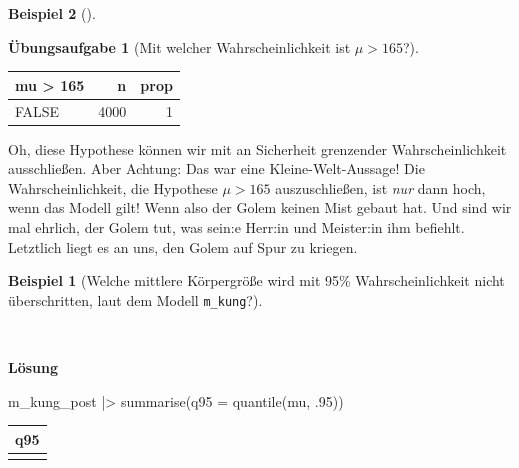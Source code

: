 \documentclass[
  ngerman,
  letterpaper,
  twoside,
  open=any]{scrbook}
\newenvironment{Shaded}{\begin{snugshade}}{\end{snugshade}}
\newcommand{\AttributeTok}[1]{\textcolor[rgb]{0.40,0.45,0.13}{#1}}
\newcommand{\DecValTok}[1]{\textcolor[rgb]{0.68,0.00,0.00}{#1}}
\newcommand{\FunctionTok}[1]{\textcolor[rgb]{0.28,0.35,0.67}{#1}}
\newcommand{\NormalTok}[1]{\textcolor[rgb]{0.00,0.23,0.31}{#1}}
\newcommand{\SpecialCharTok}[1]{\textcolor[rgb]{0.37,0.37,0.37}{#1}}
\newcounter{none} %
\theoremstyle{definition}
\newtheorem{example}{Beispiel}[chapter]
\theoremstyle{plain}
\theoremstyle{definition}
\newtheorem{exercise}{Übungsaufgabe}[chapter]
\theoremstyle{definition}
\theoremstyle{remark}
\begin{document}
\begin{example}[]
\begin{exercise}[Mit welcher Wahrscheinlichkeit ist
\(\mu>165\)?]
\begin{tcolorbox}[enhanced jigsaw, arc=.35mm, bottomrule=.15mm, breakable, colback=white, colframe=quarto-callout-tip-color-frame, left=2mm, leftrule=.75mm, opacityback=0, rightrule=.15mm, toprule=.15mm]
{\def\LTcaptype{none} %
\begin{longtable}[]{@{}lrr@{}}
\toprule\noalign{}
mu \textgreater{} 165 & n & prop \\
\midrule\noalign{}
\endhead
\bottomrule\noalign{}
\endlastfoot
FALSE & 4000 & 1 \\
\end{longtable}
}

Oh, diese Hypothese können wir mit an Sicherheit grenzender
Wahrscheinlichkeit ausschließen. Aber Achtung: Das war eine
Kleine-Welt-Aussage! Die Wahrscheinlichkeit, die Hypothese \(\mu > 165\)
auszuschließen, ist \emph{nur} dann hoch, wenn das Modell gilt! Wenn
also der Golem keinen Mist gebaut hat. Und sind wir mal ehrlich, der
Golem tut, was sein:e Herr:in und Meister:in ihm befiehlt. Letztlich
liegt es an uns, den Golem auf Spur zu kriegen.

\end{tcolorbox}

\end{exercise}

\begin{example}[Welche mittlere Körpergröße wird mit 95\%
Wahrscheinlichkeit nicht überschritten, laut dem Modell
\texttt{m\_kung}?]\protect\hypertarget{exm-kung3}{}\label{exm-kung3}

~

\begin{tcolorbox}[enhanced jigsaw, arc=.35mm, bottomrule=.15mm, breakable, colback=white, colframe=quarto-callout-tip-color-frame, left=2mm, leftrule=.75mm, opacityback=0, rightrule=.15mm, toprule=.15mm]

\vspace{-3mm}\textbf{Lösung}\vspace{3mm}

\begin{Shaded}
\begin{Highlighting}[]
\NormalTok{m\_kung\_post }\SpecialCharTok{|\textgreater{}} 
  \FunctionTok{summarise}\NormalTok{(}\AttributeTok{q95 =} \FunctionTok{quantile}\NormalTok{(mu, .}\DecValTok{95}\NormalTok{))}
\end{Highlighting}
\end{Shaded}

{\def\LTcaptype{none} %
\begin{longtable}[]{@{}r@{}}
\toprule\noalign{}
q95 \\
\midrule\noalign{}
\endhead
\bottomrule\noalign{}
\endlastfoot
155 \\
\end{longtable}
}


\end{tcolorbox}
\end{example}
\end{example}
\end{document}
